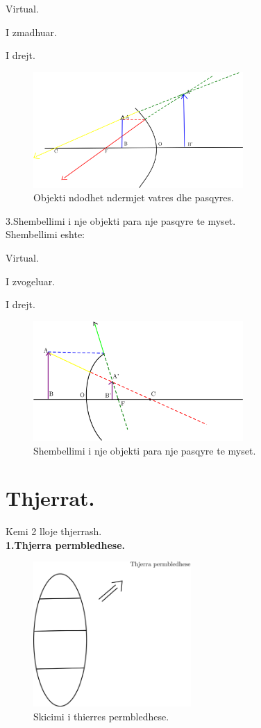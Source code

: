 \documentclass[twocolumn]{article}
\begin{document}
Virtual.

I zmadhuar.

I drejt.\\

 \begin{figure}[h]
	\includegraphics[width=80mm]{Imazhet/Objekti_ndodhet_ndermjet _vatres_dhe_pasqyres.png}
	\caption{Objekti ndodhet ndermjet vatres dhe pasqyres.}
	\label{fig:boat1}
\end{figure}

3.Shembellimi i nje objekti para nje pasqyre te myset.\\


Shembellimi eshte:

Virtual.

I zvogeluar.

I drejt.\\

\begin{figure}[h]
	\includegraphics[width=80mm]{Imazhet/Shembellimi_i_nje_objekti_para_nje_pasqyre_te_myset.png}
	\caption{Shembellimi i nje objekti para nje pasqyre te myset.}
	\label{fig:boat1}
\end{figure}


\section{Thjerrat.}
Kemi 2 lloje thjerrash.\\

\textbf{1.Thjerra permbledhese.}

\begin{figure}[h]
	\includegraphics[width=60mm]{Imazhet/thierra_permbledhese.png}
	\caption{Skicimi i thierres permbledhese.}
	\label{fig:boat1}
\end{figure}
\end{document}
